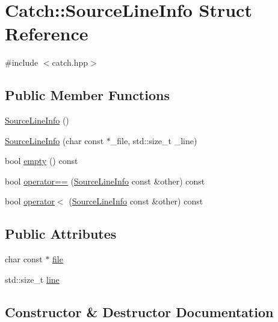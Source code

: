 \hypertarget{struct_catch_1_1_source_line_info}{}\section{Catch\+:\+:Source\+Line\+Info Struct Reference}
\label{struct_catch_1_1_source_line_info}


{\ttfamily \#include $<$catch.\+hpp$>$}

\subsection*{Public Member Functions}
\begin{DoxyCompactItemize}
\item 
\mbox{\hyperlink{struct_catch_1_1_source_line_info_a9d44b2e1133794eee0bd5716424c83d6}{Source\+Line\+Info}} ()
\item 
\mbox{\hyperlink{struct_catch_1_1_source_line_info_a6218cb890337d37f708ea94063958940}{Source\+Line\+Info}} (char const $\ast$\+\_\+file, std\+::size\+\_\+t \+\_\+line)
\item 
bool \mbox{\hyperlink{struct_catch_1_1_source_line_info_a05ab6444e9de7e9c3e76d8aa00093c3a}{empty}} () const
\item 
bool \mbox{\hyperlink{struct_catch_1_1_source_line_info_a688e761986879266658f000f14ab8a42}{operator==}} (\mbox{\hyperlink{struct_catch_1_1_source_line_info}{Source\+Line\+Info}} const \&other) const
\item 
bool \mbox{\hyperlink{struct_catch_1_1_source_line_info_a8b99a0d7b1553d8c2298c694db924be3}{operator$<$}} (\mbox{\hyperlink{struct_catch_1_1_source_line_info}{Source\+Line\+Info}} const \&other) const
\end{DoxyCompactItemize}
\subsection*{Public Attributes}
\begin{DoxyCompactItemize}
\item 
char const  $\ast$ \mbox{\hyperlink{struct_catch_1_1_source_line_info_ad65537703e9f08c1fa7777fbc3f0c617}{file}}
\item 
std\+::size\+\_\+t \mbox{\hyperlink{struct_catch_1_1_source_line_info_a841e5d696c7b9cde24e45e61dd979c77}{line}}
\end{DoxyCompactItemize}


\subsection{Constructor \& Destructor Documentation}
\mbox{\label{struct_catch_1_1_source_line_info_a9d44b2e1133794eee0bd5716424c83d6}} 
